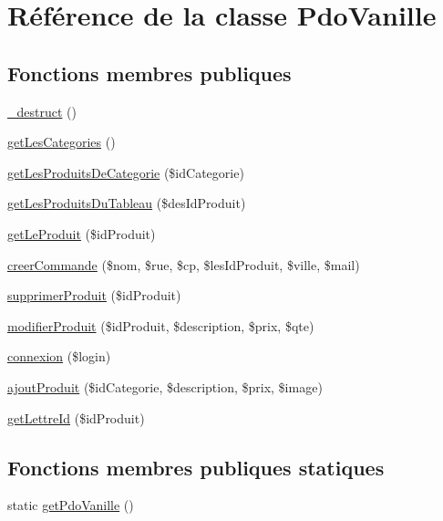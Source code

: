 \hypertarget{class_pdo_vanille}{}\section{Référence de la classe Pdo\+Vanille}
\label{class_pdo_vanille}
\subsection*{Fonctions membres publiques}
\begin{DoxyCompactItemize}
\item 
\hyperlink{class_pdo_vanille_a1c6024f681d3956654622d9f28e540a2}{\+\_\+destruct} ()
\item 
\hyperlink{class_pdo_vanille_a7dbb1b18a0595e47be50344fdc117ff5}{get\+Les\+Categories} ()
\item 
\hyperlink{class_pdo_vanille_a89d69a70c672e0962deab06c8fd9d9dc}{get\+Les\+Produits\+De\+Categorie} (\$id\+Categorie)
\item 
\hyperlink{class_pdo_vanille_af8395c02ee51ef22a209dbe6759b2451}{get\+Les\+Produits\+Du\+Tableau} (\$des\+Id\+Produit)
\item 
\hyperlink{class_pdo_vanille_a4cc89708214b88d66211df03439bb274}{get\+Le\+Produit} (\$id\+Produit)
\item 
\hyperlink{class_pdo_vanille_a16df0827e5b945a0c002aeb58944165c}{creer\+Commande} (\$nom, \$rue, \$cp, \$les\+Id\+Produit, \$ville, \$mail)
\item 
\hyperlink{class_pdo_vanille_ac85b8b4a4de025e4f2647bff5e2a6164}{supprimer\+Produit} (\$id\+Produit)
\item 
\hyperlink{class_pdo_vanille_aeb220c8cc9b836f7c162d27d0eff3768}{modifier\+Produit} (\$id\+Produit, \$description, \$prix, \$qte)
\item 
\hyperlink{class_pdo_vanille_a4598e8eaad9841cb9bd4ec5fcdf77ae7}{connexion} (\$login)
\item 
\hyperlink{class_pdo_vanille_a727d6347dc61edd23bbcb240b4ee01ec}{ajout\+Produit} (\$id\+Categorie, \$description, \$prix, \$image)
\item 
\hyperlink{class_pdo_vanille_a606ac81fcbdd73f10715d886fcd63ba4}{get\+Lettre\+Id} (\$id\+Produit)
\end{DoxyCompactItemize}
\subsection*{Fonctions membres publiques statiques}
\begin{DoxyCompactItemize}
\item 
static \hyperlink{class_pdo_vanille_a7a6d58c608b094c2ef43bace45259201}{get\+Pdo\+Vanille} ()
\end{DoxyCompactItemize}


